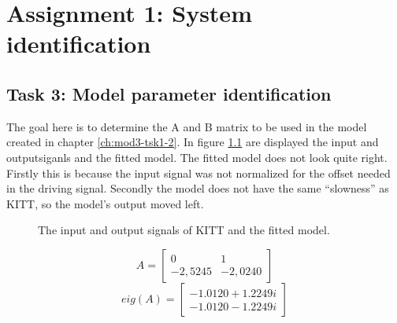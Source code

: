 \documentclass[final]{scrreprt} %
\begin{document}
\chapter{Assignment 1: System identification}
\label{ch:mod3-ass1}
\section{Task 3: Model parameter identification}
\label{sec:mod3-tsk3}
The goal here is to determine the A and B matrix to be used in the model created in chapter \ref{ch:mod3-tsk1-2}.
In figure \ref{fig:KITT-input-output-model-output} are displayed the input and outputsiganls and the fitted model.
The fitted model does not look quite right.
Firstly this is because the input signal was not normalized for the offset needed in the driving signal.
Secondly the model does not have the same “slowness” as KITT, so the model’s output moved left.

\begin{figure}[H]
	\centering
    	\setlength\figureheight{4cm}
    	\setlength{}
    	
    	\caption{The input and output signals of KITT and the fitted model.}
    	\label{fig:KITT-input-output-model-output}    	
\end{figure}
\begin{equation}
A=
\begin{bmatrix}
  0 & 1 \\
  -2,5245 & -2,0240
 \end{bmatrix}
\end{equation}
\begin{equation}
eig(A)=
\begin{bmatrix}
 -1.0120 + 1.2249i \\
  -1.0120 - 1.2249i
 \end{bmatrix}
\end{equation}
\end{document}
